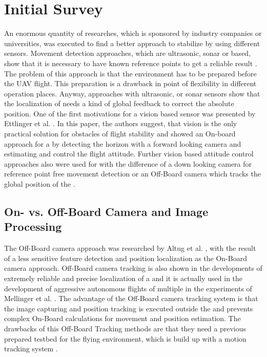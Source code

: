 \chapter{Initial Survey}

An enormous quantity of researches, which is sponsored by industry companies or
universities, was executed to find a better approach to stabilize \UAV by
using different sensors. Movement detection approaches, which are ultrasonic, sonar or
\RF based, show that it is necessary to have known reference points to get a
reliable result 
.
 The problem of this approach is that the environment has to be prepared before
 the UAV flight.
 This preparation is a drawback in point of flexibility in different operation
 places. Anyway, approaches with ultrasonic, \RF or sonar sensors show that the
 localization of \UAV needs a kind of global feedback to correct the \UAV 
 absolute position. One of the first motivations for a vision based sensor was
 presented by Ettlinger et al. 
 .
 In this paper, the authors suggest, that vision is the only practical solution
 for obstacles of flight stability and showed an On-board
approach for a \GUAV by detecting the horizon with a forward looking camera and
estimating and control the flight attitude. Further vision based attitude control
approaches also were used for \HUAV with the difference of a down looking
camera for reference point free movement detection or an Off-Board camera which
tracks the global position of the \UAV.


\section{On- vs. Off-Board Camera and Image Processing}

The Off-Board camera approach was researched by Altug et al.
,
 with the result of a less sensitive feature detection and position localization
 as the On-Board camera approach. Off-Board camera tracking is also shown in the
developments of extremely reliable and precise localization of a \UAV and it is
actually used in the development of aggressive autonomous flights of multiple
\MAV in the experiments of Mellinger et al. 
 . The advantage of
the Off-Board camera tracking system is that the image capturing and position
tracking is executed outside the \UAV and prevents complex On-Board calculations
for movement and position estimation. The drawbacks of this Off-Board Tracking
methods are that they need a previous prepared testbed for the flying
environment, which is build up with a motion tracking system 
.

